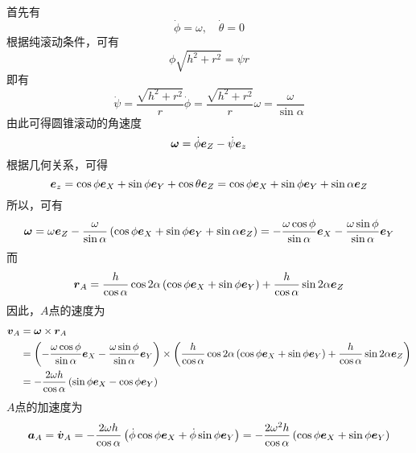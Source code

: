 \begin{solution}
首先有
\begin{equation*}
	\dot{\phi} = \omega,\quad \dot{\theta} = 0
\end{equation*}
根据纯滚动条件，可有
\begin{equation*}
	\phi \sqrt{h^2+r^2} = \psi r
\end{equation*}
即有
\begin{equation*}
	\dot{\psi} = \frac{\sqrt{h^2+r^2}}{r} \dot{\phi} = \frac{\sqrt{h^2+r^2}}{r} \omega = \frac{\omega}{\sin \alpha}
\end{equation*}
由此可得圆锥滚动的角速度
\begin{equation*}
	\boldsymbol{\omega} = \dot{\phi} \boldsymbol{e}_Z - \dot{\psi} \boldsymbol{e}_z
\end{equation*}
根据几何关系，可得
\begin{equation*}
	\boldsymbol{e}_z = \cos \phi \boldsymbol{e}_X + \sin \phi \boldsymbol{e}_Y + \cos \theta \boldsymbol{e}_Z = \cos \phi \boldsymbol{e}_X + \sin \phi \boldsymbol{e}_Y + \sin \alpha \boldsymbol{e}_Z
\end{equation*}
所以，可有
\begin{equation*}
	\boldsymbol{\omega} = \omega \boldsymbol{e}_Z - \frac{\omega}{\sin \alpha} \left(\cos \phi \boldsymbol{e}_X + \sin \phi \boldsymbol{e}_Y + \sin \alpha \boldsymbol{e}_Z\right) = -\frac{\omega \cos \phi}{\sin \alpha} \boldsymbol{e}_X - \frac{\omega \sin \phi}{\sin \alpha} \boldsymbol{e}_Y
\end{equation*}
而
\begin{equation*}
	\boldsymbol{r}_A = \frac{h}{\cos \alpha} \cos 2\alpha \left(\cos \phi \boldsymbol{e}_X + \sin \phi \boldsymbol{e}_Y\right) + \frac{h}{\cos \alpha} \sin 2\alpha \boldsymbol{e}_Z
\end{equation*}
因此，$A$点的速度为
\begin{align*}
	\boldsymbol{v}_A & = \boldsymbol{\omega} \times \boldsymbol{r}_A \\
	& = \left(-\frac{\omega \cos \phi}{\sin \alpha} \boldsymbol{e}_X - \frac{\omega \sin \phi}{\sin \alpha} \boldsymbol{e}_Y\right) \times \left(\frac{h}{\cos \alpha} \cos 2\alpha \left(\cos \phi \boldsymbol{e}_X + \sin \phi \boldsymbol{e}_Y\right) + \frac{h}{\cos \alpha} \sin 2\alpha \boldsymbol{e}_Z\right) \\
	& = -\frac{2\omega h}{\cos \alpha} \left(\sin \phi \boldsymbol{e}_X - \cos \phi \boldsymbol{e}_Y\right)
\end{align*}
$A$点的加速度为
\begin{equation*}
	\boldsymbol{a}_A = \dot{\boldsymbol{v}}_A = -\frac{2\omega h}{\cos \alpha} \left(\dot{\phi} \cos \phi \boldsymbol{e}_X + \dot{\phi} \sin \phi \boldsymbol{e}_Y\right) = -\frac{2\omega^2 h}{\cos \alpha} \left(\cos \phi \boldsymbol{e}_X + \sin \phi \boldsymbol{e}_Y\right)
\end{equation*}
\end{solution}

